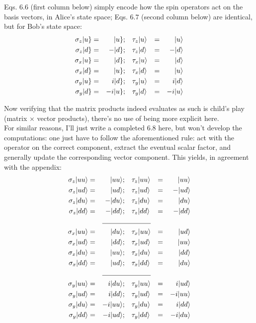 \documentclass[solutions.tex]{subfiles}
\begin{document}
Eqs. $6.6$ (first column below) simply encode how the spin operators
act on the basis vectors, in Alice's state space; Eqs. $6.7$
(second column below) are identical, but for Bob's state space:
\begin{equation*}\begin{aligned}
	\sigma_z|u\} &=&|u\}; &&& \tau_z|u\rangle &=&& |u\rangle \\
	\sigma_z|d\} &=&-|d\}; &&& \tau_z|d\rangle &=&& -|d\rangle \\
	\sigma_x|u\} &=&|d\}; &&& \tau_x|u\rangle &=&& |d\rangle \\
	\sigma_x|d\} &=&|u\}; &&& \tau_x|d\rangle &=&& |u\rangle \\
	\sigma_y|u\} &=&i|d\}; &&& \tau_y|u\rangle &=&& i|d\rangle \\
	\sigma_y|d\} &=&-i|u\}; &&& \tau_y|d\rangle &=&& -i|u\rangle \\
\end{aligned}\end{equation*}

Now verifying that the matrix products indeed evaluates as such is
child's play (matrix $\times$ vector products), there's no use
of being more explicit here. \\

For similar reasons, I'll just write a completed $6.8$ here, but won't
develop the computations: one just have to follow the aforementioned
rule: act with the operator on the correct component, extract the eventual
scalar factor, and generally update the corresponding vector component.
This yields, in agreement with the appendix:
\begin{equation*}\begin{aligned}
	\sigma_z\ket{uu} &=&\ket{uu};  &&& \tau_z\ket{uu} &=&& \ket{uu} \\
	\sigma_z\ket{ud} &=&\ket{ud};  &&& \tau_z\ket{ud} &=&& -\ket{ud} \\
	\sigma_z\ket{du} &=&-\ket{du}; &&& \tau_z\ket{du} &=&& \ket{du} \\
	\sigma_z\ket{dd} &=&-\ket{dd}; &&& \tau_z\ket{dd} &=&& -\ket{dd} \\
	 \cline{3-6}
	\sigma_x\ket{uu} &=&\ket{du}; &&& \tau_x\ket{uu} &=&& \ket{ud} \\
	\sigma_x\ket{ud} &=&\ket{dd}; &&& \tau_x\ket{ud} &=&& \ket{uu} \\
	\sigma_x\ket{du} &=&\ket{uu}; &&& \tau_x\ket{du} &=&& \ket{dd} \\
	\sigma_x\ket{dd} &=&\ket{ud}; &&& \tau_x\ket{dd} &=&& \ket{du} \\
	 \cline{3-6}
	\sigma_y\ket{uu} &=&i\ket{du};  &&& \tau_y\ket{uu} &=&& i\ket{ud} \\
	\sigma_y\ket{ud} &=&i\ket{dd};  &&& \tau_y\ket{ud} &=&& -i\ket{uu} \\
	\sigma_y\ket{du} &=&-i\ket{uu}; &&& \tau_y\ket{du} &=&& i\ket{dd} \\
	\sigma_y\ket{dd} &=&-i\ket{ud}; &&& \tau_y\ket{dd} &=&& -i\ket{du} \\
\end{aligned}\end{equation*}
\end{document}
